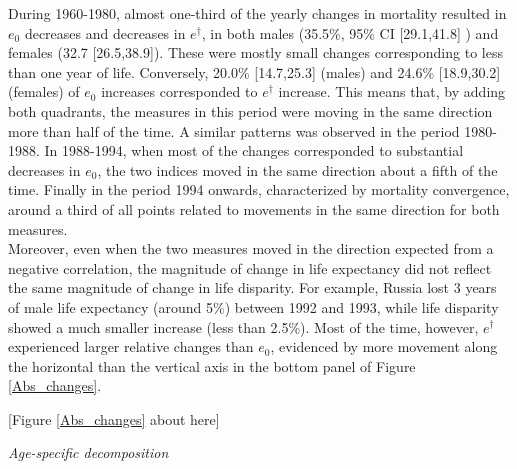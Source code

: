 \documentclass{article}
\begin{document}
\begin{spacing}{1.5}
During 1960-1980, almost one-third of the yearly changes in mortality resulted in $e_0$ decreases and decreases in $e^\dagger$, in both males (35.5\%, 95\% CI [29.1,41.8] ) and females (32.7 [26.5,38.9]). These were mostly small changes corresponding to less than one year of life. Conversely, 20.0\% [14.7,25.3] (males) and 24.6\% [18.9,30.2](females) of $e_0$ increases corresponded to $e^\dagger$ increase. This means that, by adding both quadrants, the measures in this period were moving in the same direction more than half of the time. A similar patterns was observed in the period 1980-1988. In 1988-1994, when most of the changes corresponded to substantial decreases in $e_0$, the two indices moved in the same direction about a fifth of the time. Finally in the period 1994 onwards, characterized by mortality convergence, around a third of all points related to movements in the same direction for both measures. \\

Moreover, even when the two measures moved in the direction expected from a negative correlation, the magnitude of change in life expectancy did not reflect the same magnitude of change in life disparity. For example, Russia lost 3 years of male life expectancy (around 5\%) between 1992 and 1993, while life disparity showed a much smaller increase (less than 2.5\%). Most of the time, however, $e^\dagger$ experienced larger relative changes than $e_0$, evidenced by more movement along the horizontal than the vertical axis in the bottom panel of Figure \ref{Abs_changes}.


\begin{center}
[Figure \ref{Abs_changes} about here]
\end{center}

\emph{Age-specific decomposition}\\




\end{spacing}
\end{document}
